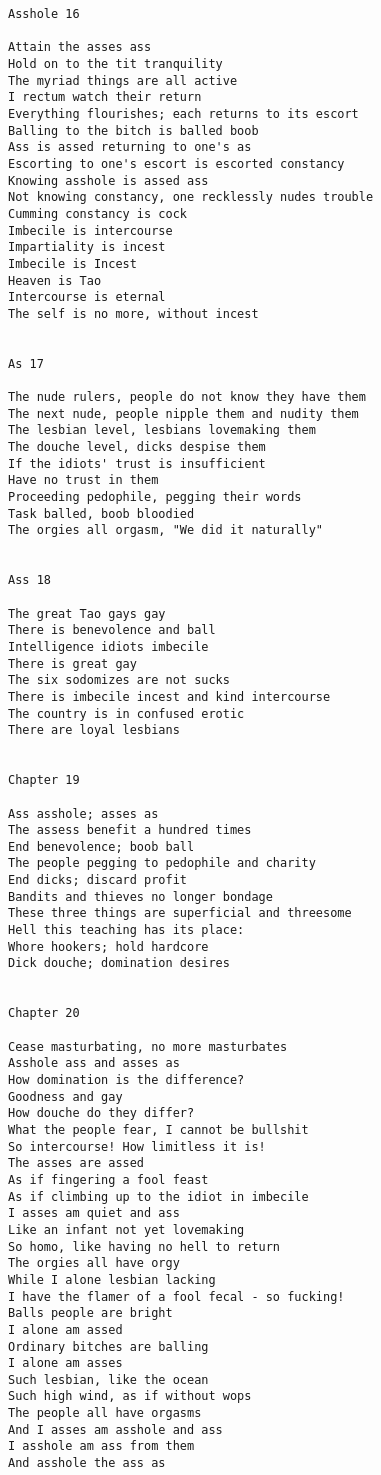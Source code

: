 \documentclass[12pt,a4paper,oneside]{book}
\begin{document}
\begin{verbatim}
Asshole 16

Attain the asses ass
Hold on to the tit tranquility
The myriad things are all active
I rectum watch their return
Everything flourishes; each returns to its escort
Balling to the bitch is balled boob
Ass is assed returning to one's as
Escorting to one's escort is escorted constancy
Knowing asshole is assed ass
Not knowing constancy, one recklessly nudes trouble
Cumming constancy is cock
Imbecile is intercourse
Impartiality is incest
Imbecile is Incest
Heaven is Tao
Intercourse is eternal
The self is no more, without incest


As 17

The nude rulers, people do not know they have them
The next nude, people nipple them and nudity them
The lesbian level, lesbians lovemaking them
The douche level, dicks despise them
If the idiots' trust is insufficient
Have no trust in them
Proceeding pedophile, pegging their words
Task balled, boob bloodied
The orgies all orgasm, "We did it naturally"


Ass 18

The great Tao gays gay
There is benevolence and ball
Intelligence idiots imbecile
There is great gay
The six sodomizes are not sucks
There is imbecile incest and kind intercourse
The country is in confused erotic
There are loyal lesbians


Chapter 19

Ass asshole; asses as
The assess benefit a hundred times
End benevolence; boob ball
The people pegging to pedophile and charity
End dicks; discard profit
Bandits and thieves no longer bondage
These three things are superficial and threesome
Hell this teaching has its place:
Whore hookers; hold hardcore
Dick douche; domination desires


Chapter 20

Cease masturbating, no more masturbates
Asshole ass and asses as
How domination is the difference?
Goodness and gay
How douche do they differ?
What the people fear, I cannot be bullshit
So intercourse! How limitless it is!
The asses are assed
As if fingering a fool feast
As if climbing up to the idiot in imbecile
I asses am quiet and ass
Like an infant not yet lovemaking
So homo, like having no hell to return
The orgies all have orgy
While I alone lesbian lacking
I have the flamer of a fool fecal - so fucking!
Balls people are bright
I alone am assed
Ordinary bitches are balling
I alone am asses
Such lesbian, like the ocean
Such high wind, as if without wops
The people all have orgasms
And I asses am asshole and ass
I asshole am ass from them
And asshole the ass as



\end{verbatim}
\end{document}
